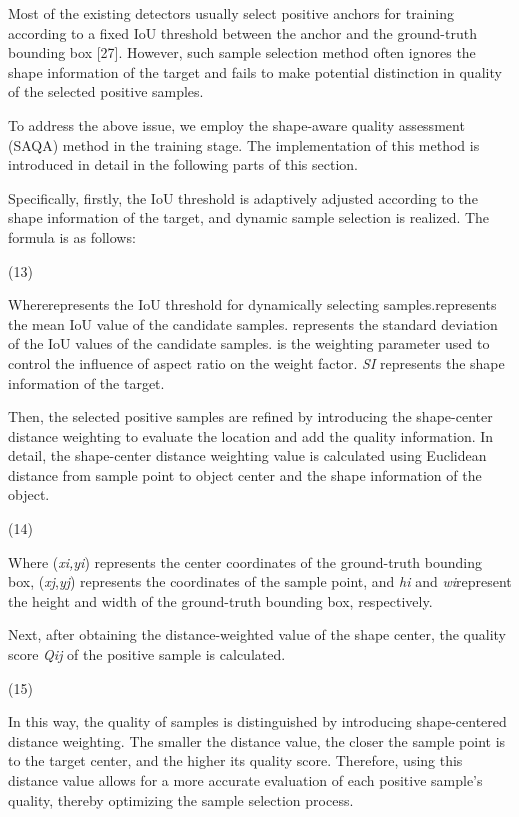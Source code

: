 \documentclass[journal]{IEEEtran}
\begin{document}
Most of the existing detectors usually select positive anchors for training according to a fixed IoU threshold between the anchor and the ground-truth bounding box [27]. However, such sample selection method often ignores the shape information of the target and fails to make potential distinction in quality of the selected positive samples.

To address the above issue, we employ the shape-aware quality assessment (SAQA) method in the training stage. The implementation of this method is introduced in detail in the following parts of this section.

Specifically, firstly, the IoU threshold is adaptively adjusted according to the shape information of the target, and dynamic sample selection is realized. The formula is as follows:

(13)

Whererepresents the IoU threshold for dynamically selecting samples.represents the mean IoU value of the candidate samples. represents the standard deviation of the IoU values of the candidate samples.  is the weighting parameter used to control the influence of aspect ratio on the weight factor. \textit{SI} represents the shape information of the target.

Then, the selected positive samples are refined by introducing the shape-center distance weighting to evaluate the location and add the quality information. In detail, the shape-center distance weighting value  is calculated using Euclidean distance from sample point to object center and the shape information of the object.

(14)

Where (\textit{x}\textit{i}\textit{,y}\textit{i}) represents the center coordinates of the ground-truth bounding box, (\textit{x}\textit{j}​,\textit{y}\textit{j}​) represents the coordinates of the sample point, and \textit{h}\textit{i}​ and \textit{w}\textit{i}​ represent the height and width of the ground-truth bounding box, respectively.

Next, after obtaining the distance-weighted value of the shape center, the quality score \textit{Q}\textit{ij }of the positive sample is calculated.

(15)

In this way, the quality of samples is distinguished by introducing shape-centered distance weighting. The smaller the distance value, the closer the sample point is to the target center, and the higher its quality score. Therefore, using this distance value allows for a more accurate evaluation of each positive sample's quality, thereby optimizing the sample selection process.
\end{document}
